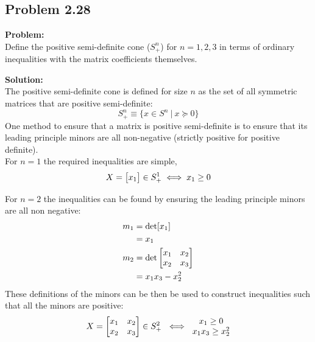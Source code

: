 \documentclass[letter]{article}
\begin{document}
\newpage
\subsection{Problem 2.28}
\textbf{Problem:}\\
Define the positive semi-definite cone ($S_+^n$) for $n = 1, 2, 3$ in terms of ordinary inequalities with the matrix coefficients themselves.

\noindent
\textbf{Solution:}\\
The positive semi-definite cone is defined for size $n$ as the set of all symmetric matrices that are positive semi-definite:
\begin{equation}
	S_+^n \equiv \{x \in S^n \ | \ x \succeq 0\}
\end{equation}
One method to ensure that a matrix is positive semi-definite is to ensure that its leading principle minors are all non-negative (strictly positive for positive definite).\\

For $n=1$ the required inequalities are simple, 
\begin{equation}
	X = \mqty[x_1] \in S_+^1 \iff x_1 \geq 0
\end{equation}

For $n=2$ the inequalities can be found by ensuring the leading principle minors are all non negative:
\begin{equation}
	\begin{aligned}
		m_1 &= \det[x_1]\\
		&= x_1\\
		m_2 &= \det \mqty[x_1 & x_2 \\ x_2 & x_3] \\
		&= x_1 x_3 - x_2^2
	\end{aligned}
\end{equation}
These definitions of the minors can be then be used to construct inequalities such that all the minors are positive:
\begin{equation}
	X = \mqty[x_1 & x_2 \\ x_2 & x_3] \in S_+^2 \ \iff \ \mqty{x_1 \geq 0\\  x_1 x_3 \geq x_2^2}
\end{equation}
\end{document}
